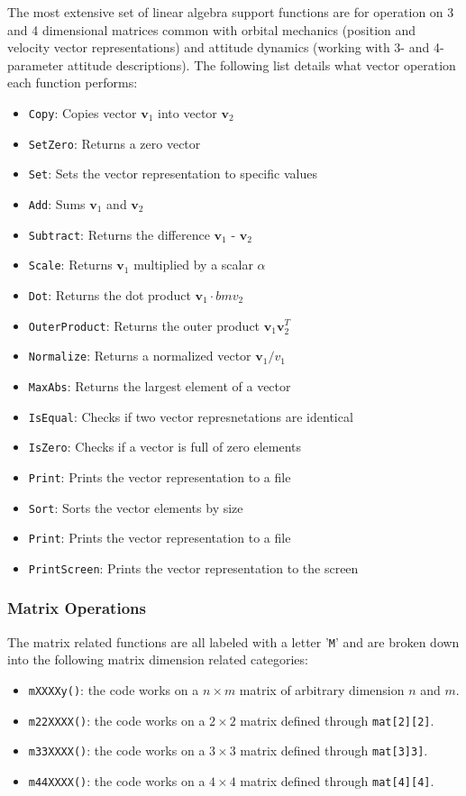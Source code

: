 The most extensive set of linear algebra support functions are for operation on 3 and 4 dimensional matrices common with orbital mechanics (position and velocity vector representations) and attitude dynamics (working with 3- and 4-parameter attitude descriptions).  The following list details what vector operation each function performs:
\begin{itemize}
	\item {\tt Copy}: Copies vector $\bm v_{1}$ into vector $\bm v_{2}$
	\item {\tt SetZero}: Returns a zero vector
	\item {\tt Set}: Sets the vector representation to specific values
	\item {\tt Add}: Sums  $\bm v_{1}$ and  $\bm v_{2}$
	\item {\tt Subtract}: Returns the difference  $\bm v_{1}$ - $\bm v_{2}$
	\item {\tt Scale}: Returns $\bm v_{1}$ multiplied by a scalar $\alpha$
	\item {\tt Dot}: Returns the dot product $\bm v_{1} \cdot bm v_{2}$
	\item {\tt OuterProduct}: Returns the outer product $\bm v_{1} \bm v_{2}^{T}$
	\item {\tt Normalize}: Returns a normalized vector $\bm v_{1}/ v_{1}$
	\item {\tt MaxAbs}: Returns the largest element of a vector
	\item {\tt IsEqual}: Checks if two vector represnetations are identical	
	\item {\tt IsZero}: Checks if a vector is full of zero elements
	\item {\tt Print}: Prints the vector representation to a file
	\item {\tt Sort}: Sorts the vector elements by size
	\item {\tt Print}: Prints the vector representation to a file
	\item {\tt PrintScreen}: Prints the vector representation to the screen
\end{itemize}





\subsubsection{Matrix Operations}
The matrix related functions are all labeled with a letter '{\tt M}' and are broken down into the following matrix dimension related categories:
\begin{itemize}
	\item  {\tt mXXXXy()}: the code works on a $n\times m$ matrix of arbitrary dimension $n$ and $m$.
	\item {\tt m22XXXX()}: the code works on a $2\times 2$ matrix defined through {\tt mat[2][2]}. 
	\item {\tt m33XXXX()}: the code works on a $3\times 3$ matrix defined through {\tt mat[3]3]}. 
	\item {\tt m44XXXX()}: the code works on a $4\times 4$ matrix defined through {\tt mat[4][4]}. 
\end{itemize}

